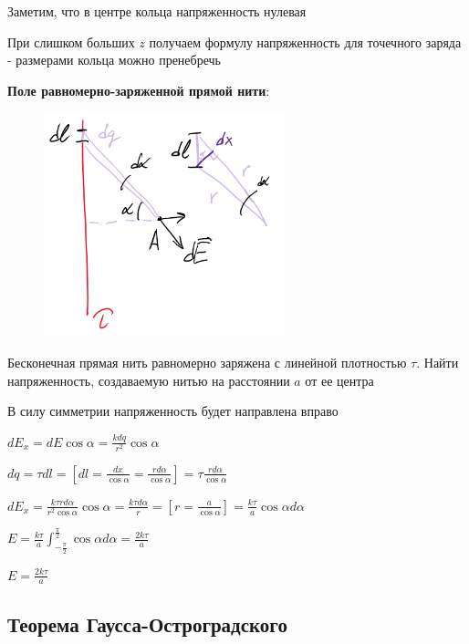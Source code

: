 \documentclass[12pt]{article}
\begin{document}
    Заметим, что в центре кольца напряженность нулевая

    При слишком больших $z$ получаем формулу напряженность для точечного заряда - размерами кольца можно пренебречь

    \mediumvspace

    

    \begin{minipage}{\textwidth}
        \textbf{Поле равномерно-заряженной прямой нити}:
        
        \begin{figure}
            \includegraphics[width=7cm]{physics1/images/physics1_2024_11_15_2}
        \end{figure}

        Бесконечная прямая нить равномерно заряжена с линейной плотностью $\tau$.
        Найти напряженность, создаваемую нитью на расстоянии $a$ от ее центра 
    
        В силу симметрии напряженность будет направлена вправо
    
        $dE_x = dE \cos\alpha = \frac{kdq}{r^2} \cos\alpha$
    
        $dq = \tau dl = \left[dl = \frac{dx}{\cos\alpha} = \frac{rd\alpha}{\cos\alpha}\right] = \tau \frac{rd\alpha}{\cos\alpha}$
    
        $dE_x = \frac{k\tau rd\alpha}{r^2 \cos\alpha} \cos\alpha = \frac{k\tau d\alpha}{r} = \left[r = \frac{a}{\cos\alpha}\right] = 
        \frac{k\tau}{a}\cos\alpha d\alpha$
    
        $E = \frac{k\tau}{a} \int_{-\frac{\pi}{2}}^{\frac{\pi}{2}} \cos\alpha d\alpha = \frac{2k\tau}{a}$
    
        $E = \frac{2k\tau}{a}$
    \end{minipage}

   
    \subsection{Теорема Гаусса-Остроградского}
\end{document}
